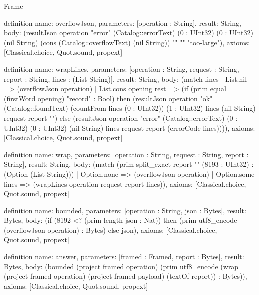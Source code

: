 \begin{lexlean}{Frame}
\begin{semanticmodule}
definition{
  name: overflowJson,
  parameters: [operation : String],
  result: String,
  body: (resultJson operation "error" (Catalog::errorText) (0 : UInt32) (0 : UInt32) (nil String) (cons (Catalog::overflowText) (nil String)) "" "" "too-large"),
  axioms: [Classical.choice, Quot.sound, propext]
}

definition{
  name: wrapLines,
  parameters: [operation : String, request : String, report : String, lines : (List String)],
  result: String,
  body: (match lines
    | List.nil => (overflowJson operation)
    | List.cons opening rest => (if (prim equal (firstWord opening) "record" : Bool) then (resultJson operation "ok" (Catalog::foundText) (countFrom lines (0 : UInt32)) (1 : UInt32) lines (nil String) request report "") else (resultJson operation "error" (Catalog::errorText) (0 : UInt32) (0 : UInt32) (nil String) lines request report (errorCode lines)))),
  axioms: [Classical.choice, Quot.sound, propext]
}

definition{
  name: wrap,
  parameters: [operation : String, request : String, report : String],
  result: String,
  body: (match (prim split_exact report "\n" (8193 : UInt32) : (Option (List String)))
    | Option.none => (overflowJson operation)
    | Option.some lines => (wrapLines operation request report lines)),
  axioms: [Classical.choice, Quot.sound, propext]
}

definition{
  name: bounded,
  parameters: [operation : String, json : Bytes],
  result: Bytes,
  body: (if (8192 <? (prim length json : Nat)) then (prim utf8_encode (overflowJson operation) : Bytes) else json),
  axioms: [Classical.choice, Quot.sound, propext]
}

definition{
  name: answer,
  parameters: [framed : Framed, report : Bytes],
  result: Bytes,
  body: (bounded (project framed operation) (prim utf8_encode (wrap (project framed operation) (project framed payload) (textOf report)) : Bytes)),
  axioms: [Classical.choice, Quot.sound, propext]
}
\end{semanticmodule}
\end{lexlean}
